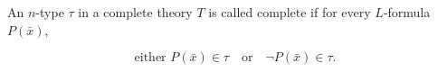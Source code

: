 An $n$-type $\tau$ in a complete theory $T$ is called complete if for every $L$-formula $P(\bar{x})$,

$$\text{either } P(\bar{x}) \in \tau \quad \text{or} \quad \neg P(\bar{x}) \in \tau.$$
